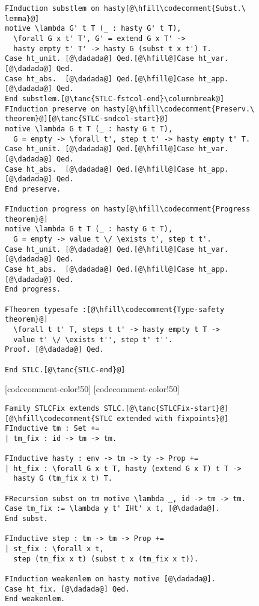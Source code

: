 \begin{figure}
\begin{minipage}{\textwidth}
\begin{multicols}{2}
\begin{lstlisting}
FInduction substlem on hasty[@\hfill\codecomment{Subst.\ lemma}@]
motive \lambda G' t T (_ : hasty G' t T),
  \forall G x t' T', G' = extend G x T' ->
  hasty empty t' T' -> hasty G (subst t x t') T.
Case ht_unit. [@\dadada@] Qed.[@\hfill@]Case ht_var. [@\dadada@] Qed.
Case ht_abs.  [@\dadada@] Qed.[@\hfill@]Case ht_app. [@\dadada@] Qed.
End substlem.[@\tanc{STLC-fstcol-end}\columnbreak@]
FInduction preserve on hasty[@\hfill\codecomment{Preserv.\ theorem}@][@\tanc{STLC-sndcol-start}@]
motive \lambda G t T (_ : hasty G t T),
  G = empty -> \forall t', step t t' -> hasty empty t' T.
Case ht_unit. [@\dadada@] Qed.[@\hfill@]Case ht_var. [@\dadada@] Qed.
Case ht_abs.  [@\dadada@] Qed.[@\hfill@]Case ht_app. [@\dadada@] Qed.
End preserve.

FInduction progress on hasty[@\hfill\codecomment{Progress theorem}@]
motive \lambda G t T (_ : hasty G t T),
  G = empty -> value t \/ \exists t', step t t'.
Case ht_unit. [@\dadada@] Qed.[@\hfill@]Case ht_var. [@\dadada@] Qed.
Case ht_abs.  [@\dadada@] Qed.[@\hfill@]Case ht_app. [@\dadada@] Qed.
End progress.

FTheorem typesafe :[@\hfill\codecomment{Type-safety theorem}@]
  \forall t t' T, steps t t' -> hasty empty t T ->
  value t' \/ \exists t'', step t' t''.
Proof. [@\dadada@] Qed.

End STLC.[@\tanc{STLC-end}@]
\end{lstlisting}

[codecomment-color!50]
[codecomment-color!50]

\vspace{-8pt}


\begin{lstlisting}[firstnumber=77]
Family STLCFix extends STLC.[@\tanc{STLCFix-start}@]
[@\hfill\codecomment{STLC extended with fixpoints}@]
FInductive tm : Set +=
| tm_fix : id -> tm -> tm.

FInductive hasty : env -> tm -> ty -> Prop +=
| ht_fix : \forall G x t T, hasty (extend G x T) t T ->
  hasty G (tm_fix x t) T.

FRecursion subst on tm motive \lambda _, id -> tm -> tm.
Case tm_fix := \lambda y t' IHt' x t, [@\dadada@].
End subst.

FInductive step : tm -> tm -> Prop +=
| st_fix : \forall x t,
  step (tm_fix x t) (subst t x (tm_fix x t)).

FInduction weakenlem on hasty motive [@\dadada@].
Case ht_fix. [@\dadada@] Qed.
End weakenlem.


\end{lstlisting}
\end{multicols}
\end{minipage}
\end{figure}
